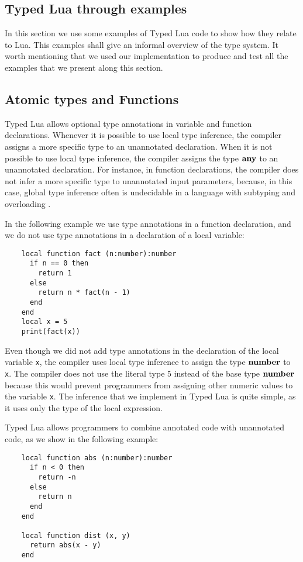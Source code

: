 \subsection{Typed Lua through examples}
\label{sec:examples}

In this section we use some examples of Typed Lua code to show how
they relate to Lua.
This examples shall give an informal overview of the type system.
It worth mentioning that we used our implementation to produce and
test all the examples that we present along this section.

\subsection{Atomic types and Functions}

Typed Lua allows optional type annotations in variable and function
declarations.
Whenever it is possible to use local type inference, the compiler
assigns a more specific type to an unannotated declaration.
When it is not possible to use local type inference, the compiler
assigns the type $\mathbf{any}$ to an unannotated declaration.
For instance, in function declarations, the compiler does not infer
a more specific type to unannotated input parameters, because,
in this case, global type inference often is undecidable in a
language with subtyping and overloading \citep{wells1999typability}.

In the following example we use type annotations in a function
declaration, and we do not use type annotations in a declaration of a
local variable:
\begin{verbatim}
    local function fact (n:number):number
      if n == 0 then
        return 1
      else
        return n * fact(n - 1)
      end
    end
    local x = 5
    print(fact(x))
\end{verbatim}

Even though we did not add type annotations in the declaration of
the local variable \texttt{x}, the compiler uses local type inference to
assign the type $\mathbf{number}$ to \texttt{x}.
The compiler does not use the literal type $5$ instead of the base
type $\mathbf{number}$ because this would prevent
programmers from assigning other numeric values to the variable
\texttt{x}.
The inference that we implement in Typed Lua is quite simple, as it
uses only the type of the local expression.

Typed Lua allows programmers to combine annotated code with
unannotated code, as we show in the following example:
\begin{verbatim}
    local function abs (n:number):number
      if n < 0 then
        return -n
      else
        return n
      end
    end

    local function dist (x, y)
      return abs(x - y)
    end
\end{verbatim}

